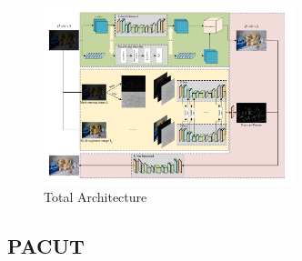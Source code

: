 \documentclass[CJK,aspectratio=169]{beamer}  %
\begin{document}
	\begin{frame}
		
		\begin{figure}[htbp]
			\begin{center}
				\includegraphics[width=0.65\textwidth]{picture/LLIE/My Architecture/Total architecture}
			\end{center}
			\captionsetup{font=scriptsize}
			\caption{
				\label{fig: Total architecture}
				Total Architecture
			}
		\end{figure}
		
	\end{frame}
	
	\subsection{PACUT}
	
\end{document}
